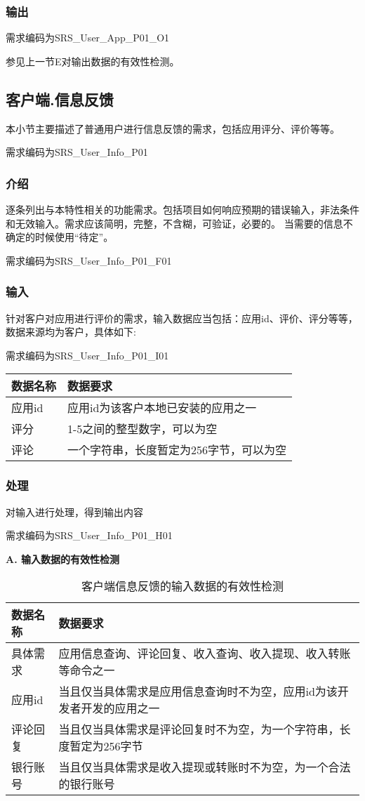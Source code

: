 \subsubsection{输出}

需求编码为SRS\_User\_App\_P01\_O1

参见上一节E对输出数据的有效性检测。



\subsection{客户端.信息反馈}
本小节主要描述了普通用户进行信息反馈的需求，包括应用评分、评价等等。

需求编码为SRS\_User\_Info\_P01
\subsubsection{介绍}
逐条列出与本特性相关的功能需求。包括项目如何响应预期的错误输入，非法条件和无效输入。需求应该简明，完整，不含糊，可验证，必要的。 当需要的信息不确定的时候使用“待定”。

需求编码为SRS\_User\_Info\_P01\_F01

\subsubsection{输入}

针对客户对应用进行评价的需求，输入数据应当包括：应用id、评价、评分等等，数据来源均为客户，具体如下:

需求编码为SRS\_User\_Info\_P01\_I01

\begin{longtable}[]{@{}ll@{}}
\toprule
数据名称 & 数据要求\tabularnewline
\midrule
\endhead
应用id & 应用id为该客户本地已安装的应用之一\tabularnewline
评分 & 1-5之间的整型数字，可以为空\tabularnewline
评论 & 一个字符串，长度暂定为256字节，可以为空\tabularnewline
\bottomrule
\end{longtable}

\subsubsection{处理}
对输入进行处理，得到输出内容

需求编码为SRS\_User\_Info\_P01\_H01

\textbf{A. 输入数据的有效性检测}

\begin{longtable}[]{@{}ll@{}}
\caption{客户端信息反馈的输入数据的有效性检测}\label{tab:client_app_info}\\
\toprule
数据名称 & 数据要求\tabularnewline
\midrule
\endhead
具体需求 & 应用信息查询、评论回复、收入查询、收入提现、收入转账等命令之一\tabularnewline
应用id & 当且仅当具体需求是应用信息查询时不为空，应用id为该开发者开发的应用之一\tabularnewline
评论回复 & 当且仅当具体需求是评论回复时不为空，为一个字符串，长度暂定为256字节\tabularnewline
银行账号 & 当且仅当具体需求是收入提现或转账时不为空，为一个合法的银行账号\tabularnewline
\bottomrule
\end{longtable}

